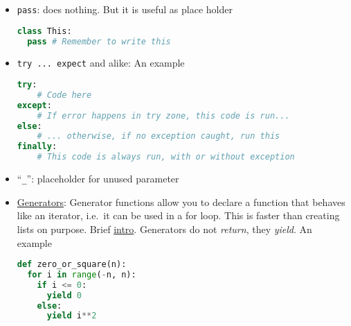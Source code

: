 \documentclass[a4paper,12pt,%
              final%
              ]{article}
\begin{document}
\begin{itemize}
\begin{itemize}
    \end{itemize}
  \item \verb|pass|: does nothing. But it is useful as place holder
\begin{lstlisting}[language=python]
class This:
  pass # Remember to write this
\end{lstlisting}
  \item \verb|try ... expect| and alike: An example
\begin{lstlisting}[language=python]
try:
    # Code here
except:
    # If error happens in try zone, this code is run...
else:
    # ... otherwise, if no exception caught, run this
finally:
    # This code is always run, with or without exception
\end{lstlisting}
  \item ``\verb|_|'': placeholder for unused parameter
  \item \href{https://wiki.python.org/moin/Generators}{Generators}: Generator functions allow you to declare a function that behaves like an iterator, i.e.~it can be used in a for loop. This is faster than creating lists on purpose. Brief \href{https://www.programiz.com/python-programming/generator}{intro}. Generators do not \emph{return}, they \emph{yield}. An example
\begin{lstlisting}[language=python]
def zero_or_square(n):
  for i in range(-n, n):
    if i <= 0:
      yield 0
    else:
      yield i**2


\end{lstlisting}
\end{itemize}
\end{document}
